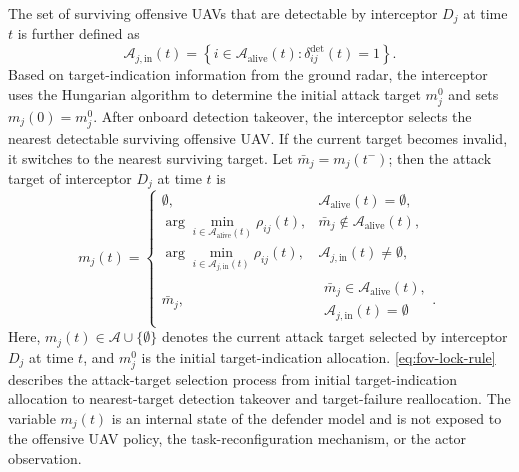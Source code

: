 \documentclass{cja}
\begin{document}
The set of surviving offensive UAVs that are detectable by interceptor $D_j$ at time $t$ is further defined as
\begin{equation}
\mathcal A_{j,\mathrm{in}}(t)
=
\left\{
i\in\mathcal A_{\mathrm{alive}}(t):
\delta_{ij}^{\mathrm{det}}(t)=1
\right\}.
\label{eq:in-detect-set}
\end{equation}
Based on target-indication information from the ground radar, the interceptor uses the Hungarian algorithm to determine the initial attack target $m_j^0$ and sets $m_j(0)=m_j^0$. After onboard detection takeover, the interceptor selects the nearest detectable surviving offensive UAV. If the current target becomes invalid, it switches to the nearest surviving target. Let $\bar m_j=m_j(t^-)$; then the attack target of interceptor $D_j$ at time $t$ is
\begin{equation}
m_j(t)=
\begin{cases}
\emptyset,
& \mathcal A_{\mathrm{alive}}(t)=\emptyset,\\[1mm]
\displaystyle \arg\min_{i\in \mathcal A_{\mathrm{alive}}(t)}
\rho_{ij}(t),
& \bar m_j\notin \mathcal A_{\mathrm{alive}}(t),\\[3mm]
\displaystyle \arg\min_{i\in \mathcal A_{j,\mathrm{in}}(t)}
\rho_{ij}(t),
& \mathcal A_{j,\mathrm{in}}(t)\neq\emptyset,\\[3mm]
\bar m_j,
& \substack{\bar m_j\in \mathcal A_{\mathrm{alive}}(t),\\
\mathcal A_{j,\mathrm{in}}(t)=\emptyset}.
\end{cases}
\label{eq:fov-lock-rule}
\end{equation}
Here, $m_j(t)\in\mathcal A\cup\{\emptyset\}$ denotes the current attack target selected by interceptor $D_j$ at time $t$, and $m_j^0$ is the initial target-indication allocation. \eqref{eq:fov-lock-rule} describes the attack-target selection process from initial target-indication allocation to nearest-target detection takeover and target-failure reallocation. The variable $m_j(t)$ is an internal state of the defender model and is not exposed to the offensive UAV policy, the task-reconfiguration mechanism, or the actor observation.
\end{document}
